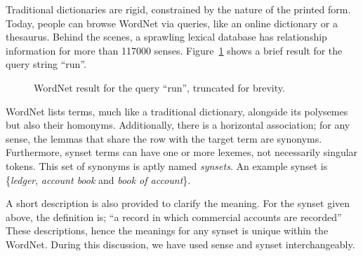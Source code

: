 Traditional dictionaries are rigid, constrained by the nature of the printed form.
Today, people can browse WordNet via queries, like an online dictionary or a thesaurus.
Behind the scenes, a sprawling lexical database has relationship information for more than 117000 senses.
Figure~\ref{fig:example_run} shows a brief result for the query string \enquote{run}.

\begin{figure}[!hbp]
    \begin{center}
        {%
            \setlength{\fboxsep}{1pt}%
            \setlength{\fboxrule}{1pt}%
        }%
        \caption{WordNet result for the query \enquote{run}, truncated for brevity.}\label{fig:example_run}
    \end{center}
\end{figure}

WordNet lists terms, much like a traditional dictionary, alongside its polysemes but also their homonyms.
Additionally, there is a horizontal association; for any sense, the lemmas that share the row with the target term are synonyms.
Furthermore, synset terms can have one or more lexemes, not necessarily singular tokens.
This set of synonyms is aptly named \emph{synsets}.
An example synset is \{\emph{ledger}, \emph{account book} and \emph{book of account}\}.

A short description is also provided to clarify the meaning.
For the synset given above, the definition is; \enquote{a record in which commercial accounts are recorded}
These descriptions, hence the meanings for any synset is unique within the WordNet.
During this discussion, we have used sense and synset interchangeably.

